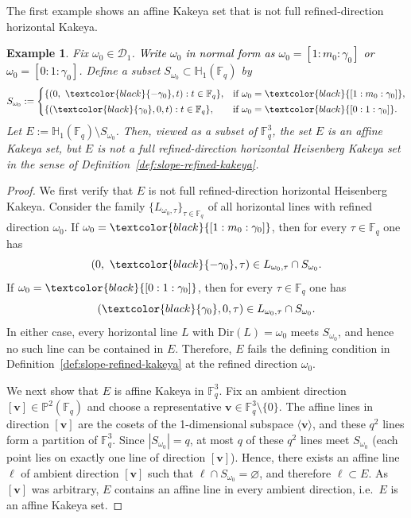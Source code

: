 \documentclass[11pt]{article}
\newtheorem{example}{Example}[section]
\newcommand{\1}{\mathbf 1}
\begin{document}
The first example shows an affine Kakeya set that is not full refined-direction horizontal Kakeya.  

\begin{example}
\label{ex:affine-not-refined}
Fix $\omega_0\in\mathcal{D}_1$. \textcolor{black}{Write $\omega_0$ in normal form as $\omega_0=[1:m_0:\gamma_0]$ or $\omega_0=[0:1:\gamma_0]$.}
Define a subset $S_{\omega_0}\subset\mathbb{H}_1(\mathbb{F}_q)$ by
\[
S_{\omega_0}:=
\begin{cases}
\{(0,\ \textcolor{black}{-\gamma_0},t): t\in\mathbb{F}_q\}, & \text{if }\omega_0=\textcolor{black}{[1:m_0:\gamma_0]},\\[0.2em]
\{(\textcolor{black}{\gamma_0},0,t): t\in\mathbb{F}_q\}, & \text{if }\omega_0=\textcolor{black}{[0:1:\gamma_0]}.
\end{cases}
\]
Let $E:=\mathbb{H}_1(\mathbb{F}_q)\setminus S_{\omega_0}$. Then, viewed as a subset of
$\mathbb{F}_q^3$, the set $E$ is an affine Kakeya set, but $E$ is not a full refined-direction
horizontal Heisenberg Kakeya set in the sense of Definition~\ref{def:slope-refined-kakeya}.
\end{example}

\begin{proof}
We first verify that $E$ is not full refined-direction horizontal Heisenberg Kakeya.  Consider the
family $\{L_{\omega_0,\tau}\}_{\tau\in\mathbb{F}_q}$ of all horizontal lines with refined direction
$\omega_0$.
If $\omega_0=\textcolor{black}{[1:m_0:\gamma_0]}$, then for every $\tau\in\mathbb{F}_q$ one has
\[
(0,\ \textcolor{black}{-\gamma_0},\tau)\in L_{\omega_0,\tau}\cap S_{\omega_0}.
\]
If $\omega_0=\textcolor{black}{[0:1:\gamma_0]}$, then for every $\tau\in\mathbb{F}_q$ one has
\[
(\textcolor{black}{\gamma_0},0,\tau)\in L_{\omega_0,\tau}\cap S_{\omega_0}.
\]
In either case, every horizontal line $L$ with $\mathrm{Dir}(L)=\omega_0$ meets $S_{\omega_0}$, and
hence no such line can be contained in $E$.  Therefore, $E$ fails the defining condition in
Definition~\ref{def:slope-refined-kakeya} at the refined direction $\omega_0$.

We next show that $E$ is affine Kakeya in $\mathbb{F}_q^3$.  Fix an ambient direction
$[\mathbf{v}]\in\mathbb{P}^2(\mathbb{F}_q)$ and choose a representative $\mathbf{v}\in\mathbb{F}_q^3\setminus\{0\}$.
The affine lines in direction $[\mathbf{v}]$ are the cosets of the 1-dimensional subspace
$\langle \mathbf{v}\rangle$, and these $q^2$ lines form a partition of $\mathbb{F}_q^3$.
Since $|S_{\omega_0}|=q$, at most $q$ of these $q^2$ lines meet $S_{\omega_0}$ (each point lies on
exactly one line of direction $[\mathbf{v}]$).  Hence, there exists an affine line $\ell$ of ambient
direction $[\mathbf{v}]$ such that $\ell\cap S_{\omega_0}=\varnothing$, and therefore $\ell\subset E$.
As $[\mathbf{v}]$ was arbitrary, $E$ contains an affine line in every ambient direction, i.e.\ $E$ is
an affine Kakeya set.
\end{proof}
\end{document}
